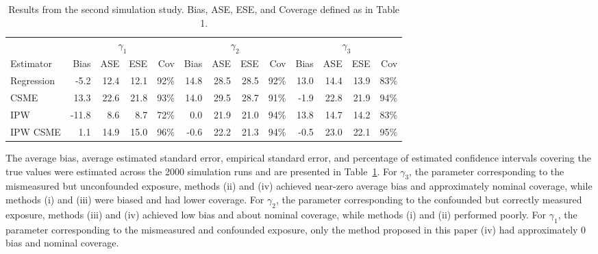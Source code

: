 \documentclass[useAMS,usenatbib,referee]{biom}
\begin{document}
\begin{table}[]
    \footnotesize
    \caption{Results from the second simulation study. Bias, ASE, ESE, and Coverage defined as in Table 1.}
    \begin{center}
    \begin{tabular}{lrrrrrrrrrrrr}
    \hline
        & \multicolumn{4}{c}{$\gamma_{1}$} & \multicolumn{4}{c}{$\gamma_{2}$} & \multicolumn{4}{c}{$\gamma_{3}$} \\
        Estimator & Bias & ASE & ESE & Cov & Bias & ASE & ESE & Cov & Bias & ASE & ESE & Cov \\
         \hline
Regression & -5.2 & 12.4 & 12.1 & 92\% & 14.8 & 28.5 & 28.5 & 92\% & 13.0 & 14.4 & 13.9 & 83\% \\
CSME & 13.3 & 22.6 & 21.8 & 93\% & 14.0 & 29.5 & 28.7 & 91\% & -1.9 & 22.8 & 21.9 & 94\% \\
IPW & -11.8 & 8.6 & 8.7 & 72\% & 0.0 & 21.9 & 21.0 & 94\% & 13.8 & 14.7 & 14.2 & 83\% \\
IPW CSME & 1.1 & 14.9 & 15.0 & 96\% & -0.6 & 22.2 & 21.3 & 94\% & -0.5 & 23.0 & 22.1 & 95\% \\
         \hline
    \end{tabular}
    \end{center}
    \label{tab:two}
\end{table}

The average bias, average estimated standard error, empirical standard error, and percentage of estimated confidence intervals covering the true values were estimated across the 2000 simulation runs and are presented in Table~\ref{tab:two}. For $\gamma_{3}$, the parameter corresponding to the mismeasured but unconfounded exposure, methods (ii) and (iv) achieved near-zero average bias and approximately nominal coverage, while methods (i) and (iii) were biased and had lower coverage. For $\gamma_{2}$, the parameter corresponding to the confounded but correctly measured exposure, methods (iii) and (iv) achieved low bias and about nominal coverage, while methods (i) and (ii) performed poorly. For $\gamma_{1}$, the parameter corresponding to the mismeasured and confounded exposure, only the method proposed in this paper (iv) had approximately 0 bias and nominal coverage.
\end{document}
